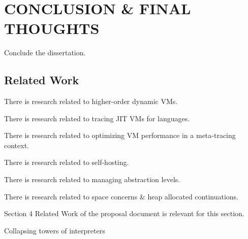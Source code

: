 \chapter[\texorpdfstring{CONCLUSION \& FINAL THOUGHTS}
                          {8. Conclusion}]{CONCLUSION \& FINAL THOUGHTS}

    \label{chapter:conclusion}

    \begin{chaptersynopsis}
        Conclude the dissertation.
    \end{chaptersynopsis}

    \section{Related Work}
        \label{section:related-work}

        \begin{mainpoint}
            There is research related to higher-order dynamic VMs.

            There is research related to tracing JIT VMs for languages.

            There is research related to optimizing VM performance in a meta-tracing context.

            There is research related to self-hosting.

            There is research related to managing abstraction levels.

            There is research related to space concerns \& heap allocated continuations.

        \end{mainpoint}

        \begin{todo}[Import]
            Section 4 Related Work of the proposal document is relevant for this section.
        \end{todo}

        Collapsing towers of interpreters




